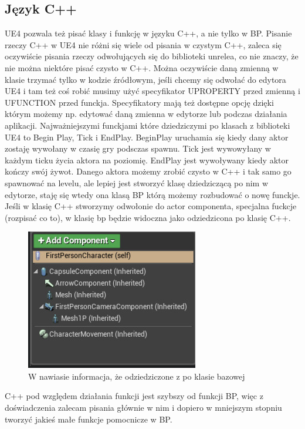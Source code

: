 \documentclass[a4paper,12pt,reqno]{article}
\begin{document}
\subsection{Język C++}
{\color{red}
 UE4 pozwala też pisać klasy i funkcję w języku C++, a nie tylko w BP. Pisanie rzeczy C++ w UE4 nie różni się wiele od pisania w czystym C++, zaleca się oczywiście pisania rzeczy odwołujących się do biblioteki unrelea, co nie znaczy, że nie można niektóre pisać czysto w C++. Można oczywiście daną zmienną w klasie trzymać tylko w kodzie źródłowym, jeśli chcemy się odwołać do edytora UE4 i tam też coś robić musimy użyć specyfikator UPROPERTY przed zmienną i UFUNCTION przed funckja. Specyfikatory mają też dostępne opcję dzięki którym możemy np. edytować daną zmienna w edytorze lub podczas działania aplikacji. Najważniejszymi funckjami które dziedziczymi po klasach z biblioteki UE4 to Begin Play, Tick i EndPlay. BeginPlay uruchamia się kiedy dany aktor zostaję wywołany w czasię gry podsczas spawnu. Tick jest wywowyłany w każdym ticku życia aktora na poziomię. EndPlay jest wywoływany kiedy aktor kończy swój żywot. Danego aktora możemy zrobić czysto w C++ i tak samo go spawnować na levelu, ale lepiej jest stworzyć klasę dziedziczącą po nim w edytorze, staję się wtedy ona klasą BP którą możemy rozbudować o nowę funckje. Jeśli w klasię C++ stworzymy odwołonie do actor componenta, specjalna fuckcje (rozpisać co to), w klasię bp będzie widoczna jako odziedzicona po klasię C++.

\begin{figure}[H]%
\centering
\includegraphics[width=0.8\columnwidth]{graphics/CppInherited.png}
\caption{W nawiasie informacja, że odziedziczone z po klasie bazowej
\label{CppInherited}}%
%
\qquad
\end{figure}   
 
  C++ pod względem działania funkcji jest szybszy od funkcji BP, więc z doświadczenia zalecam pisania głównie w nim i dopiero w mniejszym stopniu tworzyć jakieś małe funkcje pomocnicze w BP.
  }
\end{document}
